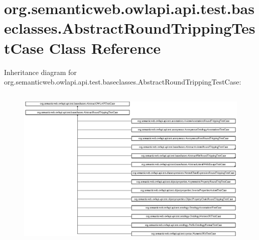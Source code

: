 \hypertarget{classorg_1_1semanticweb_1_1owlapi_1_1api_1_1test_1_1baseclasses_1_1_abstract_round_tripping_test_case}{\section{org.\-semanticweb.\-owlapi.\-api.\-test.\-baseclasses.\-Abstract\-Round\-Tripping\-Test\-Case Class Reference}
\label{classorg_1_1semanticweb_1_1owlapi_1_1api_1_1test_1_1baseclasses_1_1_abstract_round_tripping_test_case}
}
Inheritance diagram for org.\-semanticweb.\-owlapi.\-api.\-test.\-baseclasses.\-Abstract\-Round\-Tripping\-Test\-Case\-:\begin{figure}[H]
\begin{center}
\leavevmode
\includegraphics[height=7.873462cm]{classorg_1_1semanticweb_1_1owlapi_1_1api_1_1test_1_1baseclasses_1_1_abstract_round_tripping_test_case}
\end{center}
\end{figure}

